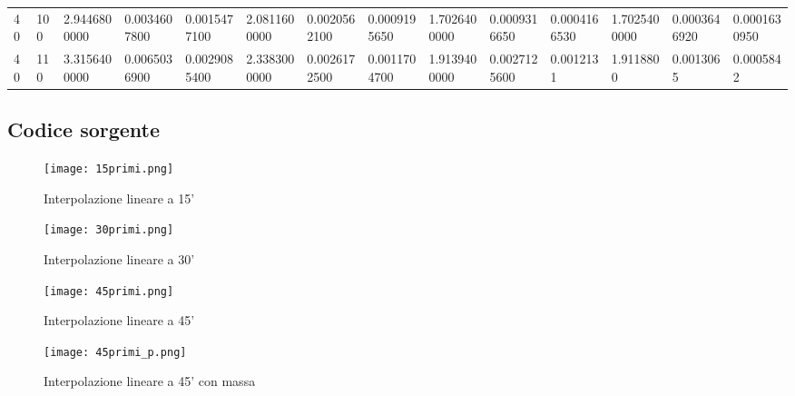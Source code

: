 \documentclass[a4paper,11pt,oneside]{article}
\begin{document}
\begin{table}[]
\begin{tabular}{ll|lll|lll|lll|lll}
40          & 100         & 2.9446800000   & 0.0034607800 & 0.0015477100           & 2.0811600000   & 0.0020562100 & 0.0009195650           & 1.7026400000   & 0.0009316650 & 0.0004166530           & 1.7025400000   & 0.0003646920 & 0.0001630950           \\
40          & 110         & 3.3156400000   & 0.0065036900 & 0.0029085400           & 2.3383000000   & 0.0026172500 & 0.0011704700           & 1.9139400000   & 0.0027125600 & 0.0012131           & 1.9118800   & 0.0013065 & 0.0005842 \\
\bottomrule
\end{tabular}
\end{table}
\subsection{Codice sorgente}


\begin{figure}[h]
    \caption{Interpolazione lineare a 15'}
    \label{fig:g_0_15}
    \centering
           \texttt{[image: 15primi.png]}
\end{figure}

\begin{figure}[h]
    \caption{Interpolazione lineare a 30'}
    \label{fig:g_0_30}
    \centering
           \texttt{[image: 30primi.png]}
\end{figure}

\begin{figure}[h]
    \caption{Interpolazione lineare a 45'}
    \label{fig:g_0_45}
    \centering
           \texttt{[image: 45primi.png]}
\end{figure}

\begin{figure}[h]
    \caption{Interpolazione lineare a 45' con massa}
    \label{fig:g_0_p45}
    \centering
           \texttt{[image: 45primi\_p.png]}
\end{figure}
\end{document}
